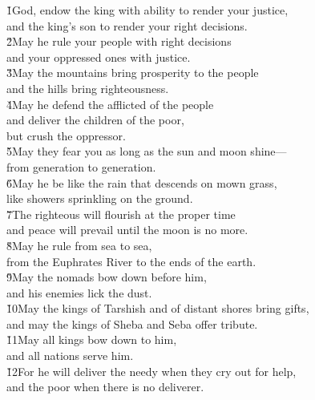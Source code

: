 \begin{poetry}
\poeml \v{1}God, endow the king with ability to render your justice, \\
\poemll    and the king's son to render your right decisions. \\
\poeml \v{2}May he rule your people with right decisions \\
\poemll    and your oppressed ones with justice. \\
\poeml \v{3}May the mountains bring prosperity to the people \\
\poemll    and the hills bring righteousness. \\
\poeml \v{4}May he defend the afflicted of the people \\
\poemll    and deliver the children of the poor, \\
\poemlll       but crush the oppressor. \\
\poeml \v{5}May they fear you as long as the sun and moon shine--- \\
\poemll    from generation to generation. \\
\poeml \v{6}May he be like the rain that descends on mown grass, \\
\poemll    like showers sprinkling on the ground. \\
\poeml \v{7}The righteous will flourish at the proper time \\
\poemll    and peace will prevail until the moon is no more. \\
\poeml \v{8}May he rule from sea to sea, \\
\poemll    from the Euphrates River to the ends of the earth. \\
\poemll    \v{9}May the nomads bow down before him, \\
\poemll    and his enemies lick the dust. \\
\poeml \v{10}May the kings of Tarshish and of distant shores bring gifts, \\
\poemll    and may the kings of Sheba and Seba offer tribute. \\
\poeml \v{11}May all kings bow down to him, \\
\poemll    and all nations serve him. \\
\poeml \v{12}For he will deliver the needy when they cry out for help, \\
\poemll    and the poor when there is no deliverer. \\

\end{poetry}

